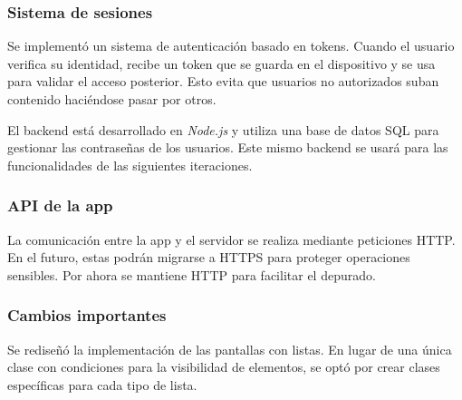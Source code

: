 \subsubsection{Sistema de sesiones}  

Se implement\'o un sistema de autenticaci\'on basado en tokens. Cuando el usuario verifica su identidad, recibe un token que se guarda en el dispositivo y se usa para validar el acceso posterior. Esto evita que usuarios no autorizados suban contenido haci\'endose pasar por otros.

El backend est\'a desarrollado en \textit{Node.js} y utiliza una base de datos SQL para gestionar las contrase\~nas de los usuarios. Este mismo backend se usar\'a para las funcionalidades de las siguientes iteraciones.

\subsubsection{API de la app}
La comunicaci\'on entre la app y el servidor se realiza mediante peticiones HTTP. En el futuro, estas podr\'an migrarse a HTTPS para proteger operaciones sensibles. Por ahora se mantiene HTTP para facilitar el depurado.

\subsubsection{Cambios importantes}
Se redise\~n\'o la implementaci\'on de las pantallas con listas. En lugar de una \'unica clase con condiciones para la visibilidad de elementos, se opt\'o por crear clases espec\'ificas para cada tipo de lista.


